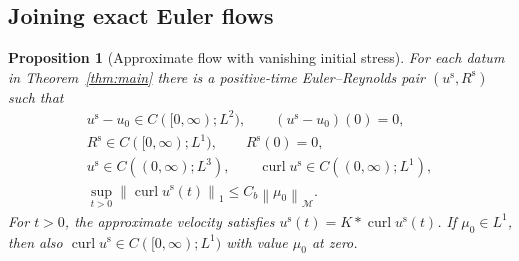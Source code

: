 \documentclass[11pt,a4paper,reqno]{amsart}
\theoremstyle{plain}
\newtheorem{proposition}[theorem]{Proposition}
\theoremstyle{definition}
\theoremstyle{remark}
\numberwithin{equation}{section}
\newcommand{\M}{\mathcal M}
\newcommand{\curl}{\operatorname{curl}}
\newcommand{\norm}[2]{\left\|#1\right\|_{#2}}
\begin{document}
\subsection{Joining exact Euler flows}

\begin{proposition}[Approximate flow with vanishing initial stress]\label{prop:seed}
For each datum in Theorem~\ref{thm:main} there is a positive-time
Euler--Reynolds pair $(u^{\mathrm s},R^{\mathrm s})$ such that
\begin{equation}\label{eq:seed-properties}
 \begin{gathered}
 u^{\mathrm s}-u_0\in C([0,\infty);L^2),\qquad
                  (u^{\mathrm s}-u_0)(0)=0,\\
 R^{\mathrm s}\in C([0,\infty);L^1),\qquad R^{\mathrm s}(0)=0,\\
 u^{\mathrm s}\in C((0,\infty);L^3),\qquad
 \curl u^{\mathrm s}\in C((0,\infty);L^1),\\
 \sup_{t>0}\norm{\curl u^{\mathrm s}(t)}1\le C_b\norm{\mu_0}\M.
 \end{gathered}
\end{equation}
For $t>0$, the approximate velocity satisfies
$u^{\mathrm s}(t)=K*\curl u^{\mathrm s}(t)$. If $\mu_0\in L^1$, then also
$\curl u^{\mathrm s}\in C([0,\infty);L^1)$ with value $\mu_0$ at zero.
\end{proposition}
\end{document}
